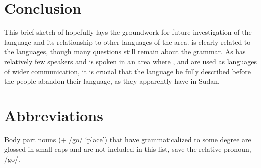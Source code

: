 \documentclass[output=paper]{langsci/langscibook}
\begin{document}
\section{Conclusion}\label{sec:ahlandc:12}

This brief sketch of  hopefully lays the groundwork for future investigation of the language and its relationship to other languages of the area.  is clearly related to the  languages, though many questions still remain about the grammar. As  has relatively few speakers and is spoken in an area where ,  and  are used as languages of wider communication, it is crucial that the language be fully described before the  people abandon their language, as they apparently have in Sudan.

\section*{Abbreviations}

Body part nouns (+ /go/ ‘place’) that have grammaticalized to some degree are glossed in small caps and are not included in this list, save the relative pronoun, /go/.
 \medskip

 
 
 
 
\end{document}
